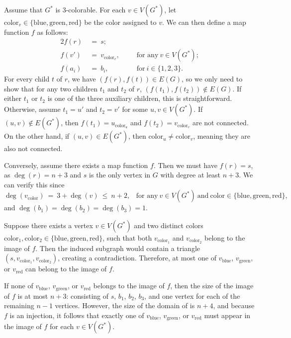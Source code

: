 \documentclass[12pt]{article}
\begin{document}
	Assume that \(G^{\ast}\) is 3-colorable. For each \(v \in V(G^{\ast})\), let
	\(\text{color}_{v} \in \{\text{blue}, \text{green}, \text{red}\}\) be the
	color assigned to \(v\). We can then define a map function \(f\) as follows:
	\begin{alignat*}{2}
		f(r) \ &= \ s \text{;} & \quad & \\
		f(v') \ &= \ v_{\text{color}_v} \text{,} & \quad & \text{for any} \ v
		\in V(G^{\ast}) \text{;} \\
		f(a_{i}) \ &= \ b_{i} \text{,} & \quad & \text{for} \ i \in \{1, 2, 3\}
		\text{.}
	\end{alignat*}
	For every child \(t\) of \(r\), we have \((f(r), f(t)) \in E(G)\), so we
	only need to show that for any two children \(t_{1}\) and \(t_{2}\) of
	\(r\), \((f(t_{1}), f(t_{2})) \notin E(G)\). If either \(t_{1}\) or
	\(t_{2}\) is one of the three auxiliary children, this is straightforward.
	Otherwise, assume \(t_{1} = u'\) and \(t_{2} = v'\) for some \(u, v \in
	V(G^{\ast})\). If \((u, v) \notin E(G^{\ast})\), then \(f(t_{1}) =
	u_{\text{color}_{u}}\) and \(f(t_{2}) = v_{\text{color}_{v}}\) are not
	connected. On the other hand, if \((u, v) \in E(G^{\ast})\), then
	\(\text{color}_{u} \neq \text{color}_{v}\), meaning they are also not
	connected.
	
	\medskip
	
	Conversely, assume there exists a map function \(f\). Then we must have
	\(f(r) = s\), as \(\deg(r) = n + 3\) and \(s\) is the only vertex in \(G\)
	with degree at least \(n + 3\). We can verify this since
	\[ \deg(v_{\text{color}}) \ = \ 3 + \deg(v) \ \leqslant \ n + 2 \text{,}
	\quad \text{for any} \ v \in V(G^{\ast}) \ \text{and} \ \text{color} \in
	\{\text{blue}, \text{green}, \text{red}\} \text{,} \]
	and \(\deg(b_{1}) = \deg(b_{2}) = \deg(b_{3}) = 1\).
	
	\medskip
	
	Suppose there exists a vertex \(v \in V(G^{\ast})\) and two distinct colors
	\(\text{color}_{1}, \text{color}_{2} \in \{\text{blue}, \text{green},
	\allowbreak \text{red}\}\), such that both \(v_{\text{color}_{1}}\) and
	\(v_{\text{color}_{2}}\) belong to the image of \(f\). Then the induced
	subgraph would contain a triangle \((s, v_{\text{color}_{1}},
	v_{\text{color}_{2}})\), creating a contradiction. Therefore, at most one of
	\(v_{\text{blue}}\), \(v_{\text{green}}\), or \(v_{\text{red}}\) can belong
	to the image of \(f\).
	
	\medskip
	
	If none of \(v_{\text{blue}}\), \(v_{\text{green}}\), or \(v_{\text{red}}\)
	belongs to the image of \(f\), then the size of the image of \(f\) is at
	most \(n + 3\): consisting of \(s\), \(b_{1}\), \(b_{2}\), \(b_{3}\), and
	one vertex for each of the remaining \(n - 1\) vertices. However, the size
	of the domain of is \(n + 4\), and because \(f\) is an injection, it follows
	that exactly one of \(v_{\text{blue}}\), \(v_{\text{green}}\), or
	\(v_{\text{red}}\) must appear in the image of \(f\) for each \(v \in
	V(G^{\ast})\).
	
\end{document}
